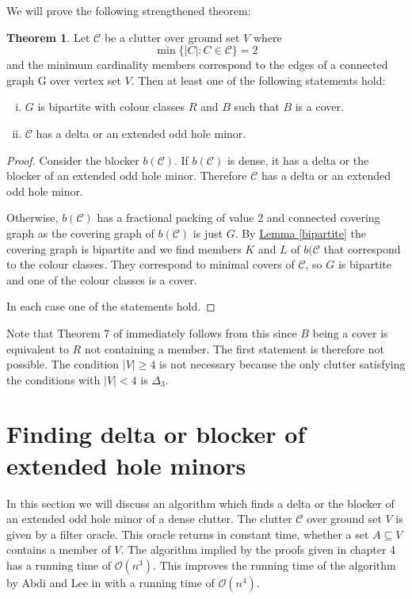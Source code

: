 \documentclass[a4paper, 12pt, twoside=false]{scrbook}
\theoremstyle{definition}
\newtheorem{theorem}{Theorem}[chapter]
\begin{document}
   We will prove the following strengthened theorem:
   \begin{theorem}
       Let $\mathcal{C}$ be a clutter over ground set $V$ where
       \[
           \min\{|C|: C \in \mathcal{C}\} = 2
           \]
           and the minimum cardinality members correspond to the edges of a connected graph G over vertex set $V$.
           Then at least one of the following statements hold:
           \leavevmode
           \begin{enumerate}[(i)]
               \item $G$ is bipartite with colour classes $R$ and $B$ such that $B$ is a cover.
               \item $\mathcal{C}$ has a delta or an extended odd hole minor.
           \end{enumerate}
    \end{theorem}

   \begin{proof}
       Consider the blocker $b(\mathcal{C})$.
       If $b(\mathcal{C})$ is dense, it has a delta or the blocker of an extended odd hole minor.
       Therefore $\mathcal{C}$ has a delta or an extended odd hole minor.

       Otherwise, $b(\mathcal{C})$ has a fractional packing of value 2 and connected covering graph as the covering graph of $b(\mathcal{C})$ is just $G$.
       By \hyperref[bipartite]{Lemma \ref*{bipartite}} the covering graph is bipartite and we find members $K$ and $L$ of $b(\mathcal{C}$ that correspond to the colour classes. They correspond to minimal covers of $\mathcal{C}$, so $G$ is bipartite and one of the colour classes is a cover.

       In each case one of the statements hold.
   \end{proof}

   Note that Theorem 7 of \cite{deltas} immediately follows from this since $B$ being a cover is equivalent to $R$ not containing a member. The first statement is therefore not possible. The condition $|V|\geq 4$ is not necessary because the only clutter satisfying the conditions with $|V|<4$ is $\Delta_3$.

   \chapter{Finding delta or blocker of extended hole minors}
   In this section we will discuss an algorithm which finds a delta or the blocker of an extended odd hole minor of a dense clutter.
   The clutter $\mathcal{C}$ over ground set $V$ is given by a filter oracle.
   This oracle returns in constant time, whether a set $A \subseteq V$ contains a member of $V$.
   The algorithm implied by the proofs given in chapter 4 has a running time of $\mathcal{O}(n^3)$.
   This improves the running time of the algorithm by Abdi and Lee in \cite{deltas} with a running time of $\mathcal{O}(n^4)$.
\end{document}
